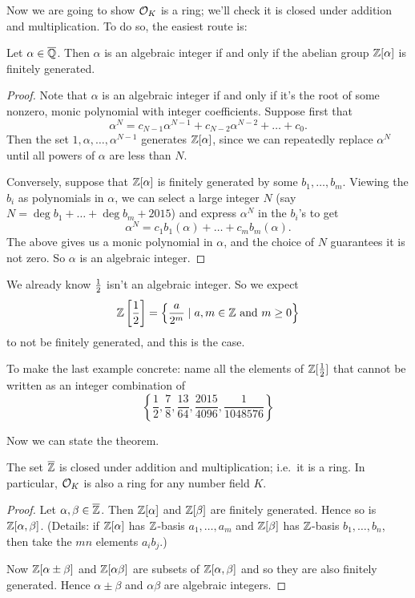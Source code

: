 Now we are going to show $\mathcal O_K$ is a ring;
we'll check it is closed under addition and multiplication.
To do so, the easiest route is:
\begin{lemma}
	Let $\alpha \in \overline{\mathbb Q}$.
	Then $\alpha$ is an algebraic integer if and only if
	the abelian group $\mathbb Z[\alpha]$ is finitely generated.
\end{lemma}
\begin{proof}
	Note that $\alpha$ is an algebraic integer if and only if it's the root
	of some nonzero, monic polynomial with integer coefficients.
	Suppose first that
	\[ \alpha^N = c_{N-1} \alpha^{N-1} + c_{N-2} \alpha^{N-2} + \dots + c_0. \]
	Then the set $1, \alpha, \dots, \alpha^{N-1}$ generates $\mathbb Z[\alpha]$,
	since we can repeatedly replace $\alpha^N$ until all powers of $\alpha$
	are less than $N$.

	Conversely, suppose that $\mathbb Z[\alpha]$ is finitely generated
	by some $b_1, \dots, b_m$.
	Viewing the $b_i$ as polynomials in $\alpha$, we can select a large integer
	$N$ (say $N = \deg b_1 + \dots + \deg b_m + 2015$)
	and express $\alpha^N$ in the $b_i$'s to get
	\[ \alpha^N = c_1b_1(\alpha) + \dots + c_mb_m(\alpha). \]
	The above gives us a monic polynomial in $\alpha$,
	and the choice of $N$ guarantees it is not zero.
	So $\alpha$ is an algebraic integer.
\end{proof}
\begin{example}
	We already know $\frac{1}{2}$ isn't an algebraic integer.
	So we expect
	\[ \mathbb Z \left[ \frac{1}{2} \right] = \left\{ \frac{a}{2^m}
		\mid a, m \in \mathbb Z \text{ and } m \ge 0 \right\} \]
	to not be finitely generated, and this is the case.
\end{example}
\begin{ques}
	To make the last example concrete:
	name all the elements of $\mathbb Z[\frac{1}{2}]$
	that cannot be written as an integer combination of
	\[ \left\{ \frac12, \frac{7}{8}, \frac{13}{64},
		\frac{2015}{4096}, \frac{1}{1048576} \right\} \]
\end{ques}

Now we can state the theorem.
\begin{theorem}
	The set $\overline{\mathbb Z}$ is closed under addition and multiplication;
	i.e.\ it is a ring.
	In particular, $\mathcal O_K$ is also a ring for any number field $K$.
\end{theorem}
\begin{proof}
	Let $\alpha, \beta \in \overline{\mathbb Z}$.
	Then $\mathbb Z[\alpha]$ and $\mathbb Z[\beta]$ are finitely generated.
	Hence so is $\mathbb Z[\alpha, \beta]$.
	(Details: if $\mathbb Z[\alpha]$ has $\mathbb Z$-basis $a_1, \dots, a_m$ and
	$\mathbb Z[\beta]$ has $\mathbb Z$-basis $b_1, \dots, b_n$,
	then take the $mn$ elements $a_ib_j$.)

	Now $\mathbb Z[\alpha \pm \beta]$ and $\mathbb Z[\alpha \beta]$ are subsets of $\mathbb Z[\alpha,\beta]$ and so they are also finitely generated.
	Hence $\alpha \pm \beta$ and $\alpha\beta$ are algebraic integers.
\end{proof}

